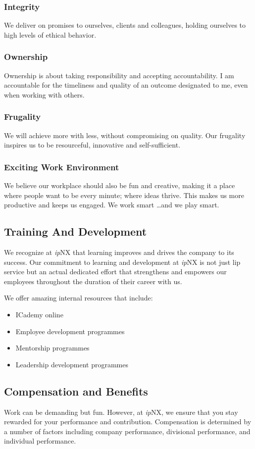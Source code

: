 \subsubsection{Integrity} We deliver on promises to ourselves, clients and colleagues, holding ourselves to high levels of ethical behavior.
\subsubsection{Ownership} Ownership is about taking responsibility and accepting accountability. I am accountable for the timeliness and quality of an outcome designated to me, even when working with others.
\subsubsection{Frugality} We will achieve more with less, without compromising on quality. Our frugality inspires us to be     resourceful, innovative    and self-sufficient.
\subsubsection{Exciting Work Environment} We believe our workplace should also be fun and creative, making it a place where people want to be every minute; where ideas thrive. This makes us more productive and keeps us engaged. We work smart …and we play smart.
\subsection{Training And Development}
We recognize at \textit{ip}NX that learning improves and drives the company to its success. Our commitment to learning and development at \textit{ip}NX is not just lip service but an actual dedicated effort that strengthens and empowers our employees throughout the duration of their career with us.

We offer amazing internal resources that include:
\begin{itemize}
	\item ICademy online
	\item Employee development programmes
	\item Mentorship programmes
	\item Leadership development programmes
\end{itemize}
\subsection{Compensation and Benefits}
Work can be demanding but fun. However, at \textit{ip}NX, we ensure that you stay rewarded for your performance and contribution. Compensation is determined by a number of factors including company performance, divisional performance, and individual performance.

